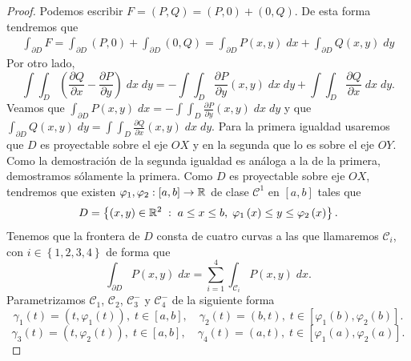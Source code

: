 \begin{proof}
Podemos escribir $\displaystyle F = \left(P,Q\right)=\left(P,0\right)+\left(0,Q\right) $. De esta forma tendremos que 
\[
\begin{split}
	\int _{\partial D}F = \int _{\partial D}\left(P,0\right) +\int _{\partial D}\left(0,Q\right) = \int _{\partial D}P\left(x,y\right) \; dx + \int _{\partial D}Q\left(x,y\right) \; dy
	\end{split}
\]
Por otro lado, 
\[\int \int _{D}\left(\frac{\partial Q}{\partial x}-\frac{\partial P}{\partial y}\right) \; dx \; dy = -\int \int _{D}\frac{\partial P}{\partial y}\left(x,y\right) \; dx \; dy + \int \int _{D}\frac{\partial Q}{\partial x} \; dx \; dy .\]
Veamos que $\displaystyle \int _{\partial D}P\left(x,y\right) \; dx = -\int \int _{D}\frac{\partial P}{\partial y}\left(x,y\right) \; dx \; dy $ y que $\displaystyle \int _{\partial D}Q\left(x,y\right) \; dy = \int \int _{D}\frac{\partial Q}{\partial x}\left(x,y\right) \; dx \; dy $. Para la primera igualdad usaremos que $\displaystyle D $ es proyectable sobre el eje $\displaystyle OX $ y en la segunda que lo es sobre el eje $\displaystyle OY $. Como la demostración de la segunda igualdad es análoga a la de la primera, demostramos sólamente la primera.
Como $\displaystyle D $ es proyectable sobre eje $\displaystyle OX $, tendremos que existen $\displaystyle \varphi_{1}, \varphi_{2} : \left[a,b\right] \to \mathbb{R} $ de clase $\displaystyle \mathcal{C}^{1} $ en $\displaystyle \left[a,b\right]  $ tales que 
\[D = \left\{ \left(x,y\right) \in \mathbb{R}^{2} \; : \; a \leq x \leq b, \; \varphi_{1}\left(x\right)\leq y \leq \varphi_{2}\left(x\right)\right\}  .\]
Tenemos que la frontera de $\displaystyle D $ consta de cuatro curvas a las que llamaremos $\displaystyle \mathcal{C}_{i} $, con $\displaystyle i \in \left\{ 1, 2, 3, 4\right\}  $ de forma que
\[\int _{\partial D}P\left(x,y\right) \; dx = \sum^{4}_{i = 1}\int _{\mathcal{C}_{i}}P\left(x,y\right) \; dx .\]
Parametrizamos $\displaystyle \mathcal{C}_{1} $, $\displaystyle \mathcal{C}_{2} $, $\displaystyle \mathcal{C}_{3}^{-} $ y $\displaystyle \mathcal{C}_{4}^{-} $ de la siguiente forma
\[\gamma_{1}\left(t\right)=\left(t, \varphi_{1}\left(t\right)\right), \; t \in \left[a,b\right] , \quad \gamma_{2}\left(t\right)=\left(b, t\right), \; t \in \left[\varphi_{1}\left(b\right), \varphi_{2}\left(b\right)\right]   .\]
\[\gamma_{3}\left(t\right)=\left(t, \varphi_{2}\left(t\right)\right), \; t \in \left[a,b\right], \quad \gamma_{4}\left(t\right)=\left(a,t\right), \; t \in \left[\varphi_{1}\left(a\right), \varphi_{2}\left(a\right)\right]  .\]

\end{proof}

